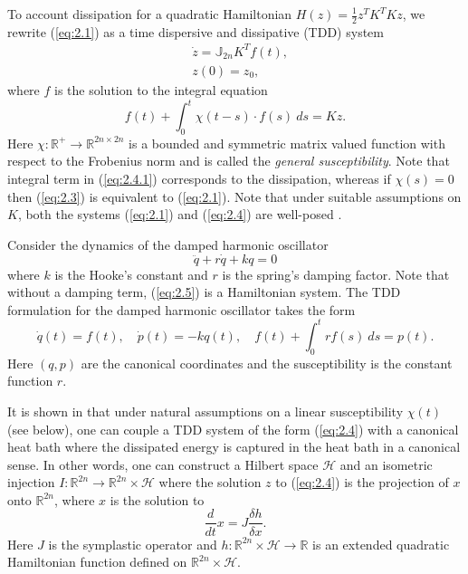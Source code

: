 To account dissipation for a quadratic Hamiltonian $H(z) = \frac 1 2 z^T K^T K  z$, we rewrite (\ref{eq:2.1}) as a time dispersive and dissipative (TDD) \cite{Figotin:2006jy} system 
\begin{equation} \label{eq:2.4}
	\begin{aligned}
		& \dot {z} = \mathbb J_{2n} K^T f(t), \\
		& z(0) = z_0,
	\end{aligned}
\end{equation}
where $f$ is the solution to the integral equation
\begin{equation} \label{eq:2.4.1}
	f(t) + \int_0^t \chi(t-s) \cdot f(s)\ ds = K z.
\end{equation}
Here $\chi:\mathbb R^+\to \mathbb R^{2n\times 2n}$ is a bounded and symmetric matrix valued function with respect to the Frobenius norm and is called the \emph{general susceptibility}. Note that integral term in (\ref{eq:2.4.1}) corresponds to the dissipation, whereas if $\chi(s) = 0$ then (\ref{eq:2.3}) is equivalent to (\ref{eq:2.1}). Note that under suitable assumptions on $K$, both the systems (\ref{eq:2.1}) and (\ref{eq:2.4}) are well-posed \cite{Figotin:2006jy}.

\begin{example}
Consider the dynamics of the damped harmonic oscillator
\begin{equation} \label{eq:2.5}
	\ddot q + r \dot q + k q = 0
\end{equation}
where $k$ is the Hooke's constant and $r$ is the spring's damping factor. Note that without a damping term, (\ref{eq:2.5}) is a Hamiltonian system. The TDD formulation for the damped harmonic oscillator takes the form
\begin{equation} \label{eq:2.6}
	\dot q(t) = f(t), \quad \dot p(t) = - k q(t), \quad f(t) + \int_0^t r f(s) \ ds = p(t).
\end{equation}
Here $(q,p)$ are the canonical coordinates and the susceptibility is the constant function $r$.
\end{example}

It is shown in \cite{Figotin:2006jy,Figotin:2005} that under natural assumptions on a linear susceptibility $\chi(t)$ (see below), one can couple a TDD system of the form (\ref{eq:2.4}) with a canonical heat bath where the dissipated energy is captured in the heat bath in a canonical sense. In other words, one can construct a Hilbert space $\mathcal H$ and an isometric injection $I:\mathbb R^{2n} \to \mathbb R^{2n}\times \mathcal H$ where the solution $z$ to (\ref{eq:2.4}) is the projection of $x$ onto $\mathbb R^{2n}$, where $x$ is the solution to
\begin{equation} \label{eq:2.7}
	\frac{d}{dt} x = J \frac{\delta h}{\delta x}.
\end{equation}
Here $J$ is the symplastic operator and $h:\mathbb R^{2n}\times \mathcal H \to \mathbb R$ is an extended quadratic Hamiltonian function defined on $\mathbb R^{2n}\times \mathcal H$.

